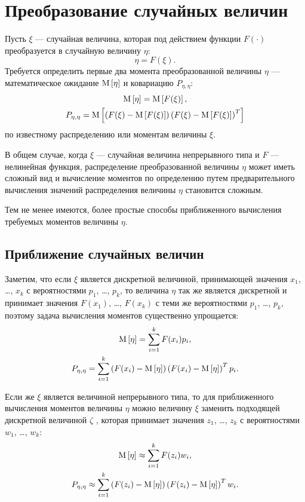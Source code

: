 \chapter{Преобразование случайных величин}

Пусть $\xi$ --- случайная величина, которая под действием функции $F(\cdot)$ преобразуется в случайную величину $\eta$:
$$
    \eta = F(\xi).
$$
Требуется определить первые два момента преобразованной величины $\eta$ --- математическое ожидание $\mathrm{M} \left [ \eta \right ]$ и ковариацию $P_{\eta,\eta}$:
\begin{gather*}
    \mathrm{M} \left [ \eta \right ] = \mathrm{M} \left [ F(\xi) \right ] , \\
    P_{\eta,\eta} = \mathrm{M} \left [ \left ( F(\xi) - \mathrm{M} \left [ F(\xi) \right ] \right ) \left ( F(\xi) - \mathrm{M} \left [ F(\xi) \right ] \right )^T \right ]
\end{gather*}
по известному распределению или моментам величины $\xi$.

В общем случае, когда $\xi$ --- случайная величина непрерывного типа и $F$ --- нелинейная функция, распределение преобразованной величины $\eta$ может иметь
сложный вид и вычисление моментов по определению путем предварительного вычисления значений распределения величины $\eta$ становится сложным.

Тем не менее имеются, более простые способы приближенного вычисления требуемых моментов величины $\eta$.

\section{Приближение случайных величин} \label{section:filtering:conversion:unscented}

Заметим, что если $\xi$ является дискретной величиной, принимающей значения $x_1$, \dots, $x_k$ с вероятностями $p_1$, \dots, $p_k$, то величина $\eta$
так же является дискретной и принимает значения $F(x_1)$, \dots, $F(x_k)$ с теми же вероятностями $p_1$, \dots, $p_k$, поэтому задача вычисления моментов
существенно упрощается:
\begin{gather*}
    \mathrm{M} \left [ \eta \right ] = \sum_{i=1}^k F(x_i) p_i , \\
    P_{\eta,\eta} = \sum_{i=1}^k \left ( F(x_i) - \mathrm{M} \left [ \eta \right ] \right ) \left ( F(x_i) - \mathrm{M} \left [ \eta \right ] \right )^T p_i .
\end{gather*}

Если же $\xi$ является величиной непрерывного типа, то для приближенного вычисления моментов величины $\eta$ можно величину $\xi$ заменить подходящей
дискретной величиной $\zeta$ \cite{UKF,UT}, которая принимает значения $z_1$, \dots, $z_k$ с вероятностями $w_1$, \dots, $w_k$:
\begin{gather*}
    \mathrm{M} \left [ \eta \right ] \approx \sum_{i=1}^k F(z_i) w_i , \\
    P_{\eta,\eta} \approx \sum_{i=1}^k \left ( F(z_i) - \mathrm{M} \left [ \eta \right ] \right ) \left ( F(z_i) - \mathrm{M} \left [ \eta \right ] \right )^T w_i .
\end{gather*}

